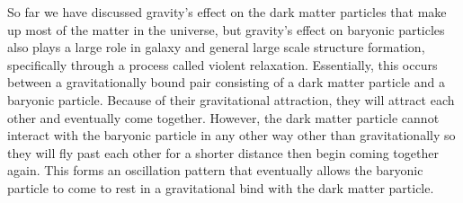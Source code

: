 \documentclass[12pt]{article}
\begin{document}
So far we have discussed gravity's effect on the dark matter particles that make
up most of the matter in the universe, but gravity's effect on baryonic
particles also plays a large role in galaxy and general large scale structure
formation, specifically through a process called violent relaxation.
Essentially, this occurs between a gravitationally bound pair consisting of a
dark matter particle and a baryonic particle.  Because of their gravitational
attraction, they will attract each other and eventually come together.  However,
the dark matter particle cannot interact with the baryonic particle in any other
way other than gravitationally so they will fly past each other for a shorter
distance then begin coming together again.  This forms an oscillation pattern
that eventually allows the baryonic particle to come to rest in a gravitational
bind with the dark matter particle.
\end{document}
